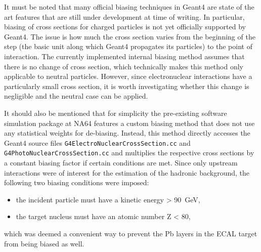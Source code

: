 It must be noted that many official biasing techniques in Geant4 are state of the art features that are still under development at time of writing. In particular, biasing of cross sections for charged particles is not yet officially supported by Geant4. The issue is how much the cross section varies from the beginning of the step (the basic unit along which Geant4 propagates its particles) to the point of interaction. The currently implemented internal biasing method assumes that there is no change of cross section, which technically makes this method only applicable to neutral particles. However, since electronuclear interactions have a particularly small cross section, it is worth investigating whether this change is negligible and the neutral case can be applied.

It should also be mentioned that for simplicity the pre-existing software simulation package at NA64 features a custom biasing method that does not use any statistical weights for de-biasing. Instead, this method directly accesses the Geant4 source files \verb|G4ElectroNuclearCrossSection.cc| and \verb|G4PhotoNuclearCrossSection.cc| and multiplies the respective cross sections by a constant biasing factor if certain conditions are met. Since only upstream interactions were of interest for the estimation of the hadronic background, the following two biasing conditions were imposed:

\begin{itemize}
    \item the incident particle must have a kinetic energy > \SI{90}{\giga\electronvolt},
    \item the target nucleus must have an atomic number Z < 80,
\end{itemize}

\noindent which was deemed a convenient way to prevent the Pb layers in the ECAL target from being biased as well. 


